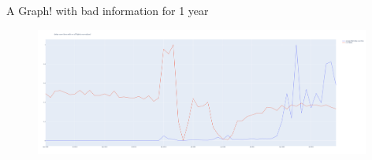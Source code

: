 \documentclass[10pt]{beamer}
\begin{document}
\begin{frame}{A Graph! with bad information for 1 year}
\begin{figure}
    \centering
    \includegraphics[width=11cm]{images/2018-2022bad.png}
    \label{fig:my_label}
\end{figure}
\end{frame}





%  
%  

\end{document}
